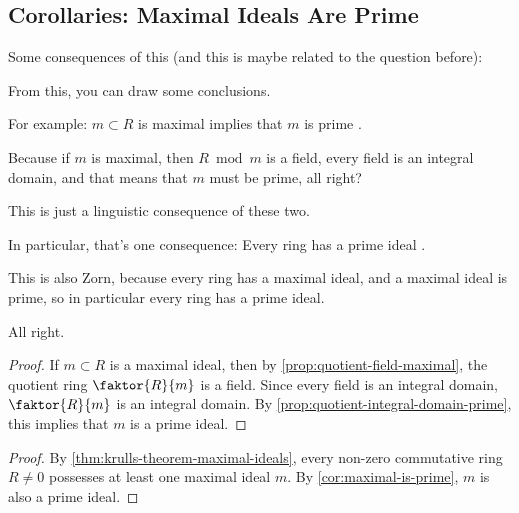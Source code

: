 \subsection{Corollaries: Maximal Ideals Are Prime}

\begin{speech}[01:02:08 - 01:03:02]
Some consequences of this (and this is maybe related to the question before):

From this, you can draw some conclusions.

For example: $m \subset R$ is maximal implies that $m$ is prime .

Because if $m$ is maximal, then $R \bmod m$ is a field, every field is an integral domain, and that means that $m$ must be prime, all right?

This is just a linguistic consequence of these two.

In particular, that's one consequence: Every ring has a prime ideal .

This is also Zorn, because every ring has a maximal ideal, and a maximal ideal is prime, so in particular every ring has a prime ideal.

All right.
\end{speech}

\begin{content}

\begin{proof}
If $m \subset R$ is a maximal ideal, then by \cref{prop:quotient-field-maximal}, the quotient ring $\faktor{R}{m}$ is a field. Since every field is an integral domain, $\faktor{R}{m}$ is an integral domain. By \cref{prop:quotient-integral-domain-prime}, this implies that $m$ is a prime ideal.
\end{proof}


\begin{proof}
By \cref{thm:krulls-theorem-maximal-ideals}, every non-zero commutative ring $R \neq 0$ possesses at least one maximal ideal $m$. By \cref{cor:maximal-is-prime}, $m$ is also a prime ideal.
\end{proof}
\end{content}

